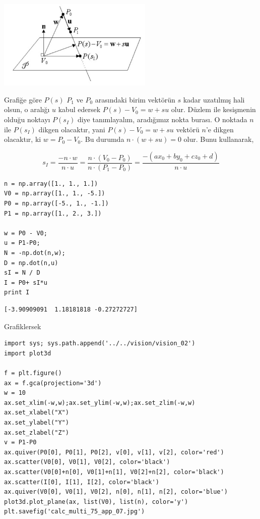 \documentclass[12pt,fleqn]{article}\usepackage{../../common}
\begin{document}
\includegraphics[width=20em]{calc_multi_75_app_06.jpg}

Grafiğe göre $P(s)$ $P_1$ ve $P_0$ arasındaki birim vektörün $s$ kadar
uzatılmış hali olsun, o aralığı $u$ kabul edersek $P(s)-V_0 = w + su$
olur. Düzlem ile kesişmenin olduğu noktayı $P(s_I)$ diye tanımlayalım,
aradığımız nokta burası. O noktada $n$ ile $P(s_I)$ dikgen olacaktır, yani
$P(s) - V_0 = w + su$ vektörü $n$'e dikgen olacaktır, ki $w=P_0-V_0$. Bu
durumda $n \cdot (w+su) = 0$ olur. Bunu kullanarak,

$$ s_I = \frac{-n \cdot w}{n \cdot u} = 
\frac{n \cdot (V_0 - P_0)}{n \cdot (P_1-P_0)} = 
\frac{-(ax_0 + by_0 + cz_0 + d)}{n \cdot u}
$$

\begin{verbatim}
n = np.array([1., 1., 1.])
V0 = np.array([1., 1., -5.])
P0 = np.array([-5., 1., -1.])
P1 = np.array([1., 2., 3.])

w = P0 - V0;
u = P1-P0;
N = -np.dot(n,w);
D = np.dot(n,u)
sI = N / D
I = P0+ sI*u
print I
\end{verbatim}

\begin{verbatim}
[-3.90909091  1.18181818 -0.27272727]
\end{verbatim}

Grafiklersek

\begin{verbatim}
import sys; sys.path.append('../../vision/vision_02')
import plot3d

f = plt.figure()
ax = f.gca(projection='3d')
w = 10
ax.set_xlim(-w,w);ax.set_ylim(-w,w);ax.set_zlim(-w,w)
ax.set_xlabel("X")
ax.set_ylabel("Y")
ax.set_zlabel("Z")
v = P1-P0
ax.quiver(P0[0], P0[1], P0[2], v[0], v[1], v[2], color='red')
ax.scatter(V0[0], V0[1], V0[2], color='black')
ax.scatter(V0[0]+n[0], V0[1]+n[1], V0[2]+n[2], color='black')
ax.scatter(I[0], I[1], I[2], color='black')
ax.quiver(V0[0], V0[1], V0[2], n[0], n[1], n[2], color='blue')
plot3d.plot_plane(ax, list(V0), list(n), color='y')
plt.savefig('calc_multi_75_app_07.jpg')
\end{verbatim}
\end{document}
